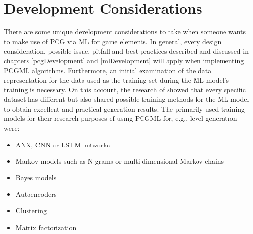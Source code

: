 \documentclass[MGS,Master,english]{twbook}%
\begin{document}
\section{Development Considerations} \label{PCGML::devConsiderations}
There are some unique development considerations to take when someone wants to make use of PCG via ML for game elements. In general, every design consideration, possible issue, pitfall and best practices described and discussed in chapters \ref{pcgDevelopment} and \ref{mlDevelopment} will apply when implementing PCGML algorithms. Furthermore, an initial examination of the data representation for the data used as the training set during the ML model’s training is necessary. On this account, the research of \cite{pcgml::paper} showed that every specific dataset has different but also shared possible training methods for the ML model to obtain excellent and practical generation results. The primarily used training models for their research purposes of using PCGML for, e.g., level generation were:
\begin{itemize}
	\item \ac{ANN}, \ac{CNN} or \ac{LSTM} networks
	\item Markov models such as N-grams or multi-dimensional Markov chains
	\item Bayes models
	\item Autoencoders
	\item Clustering
	\item Matrix factorization
\end{itemize} 
\end{document}
